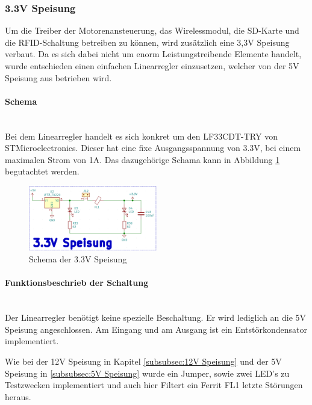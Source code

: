 \subsubsection{3.3V Speisung}
\label{subsubsec:3.3V Speisung}

Um die Treiber der Motorenansteuerung, das Wirelessmodul, die SD-Karte und die RFID-Schaltung betreiben zu können, wird zusätzlich eine 3,3V Speisung verbaut. Da es sich dabei nicht um enorm Leistungstreibende Elemente handelt, wurde entschieden einen einfachen Linearregler einzusetzen, welcher von der 5V Speisung aus betrieben wird. 

\paragraph{Schema}\mbox{}\\

Bei dem Linearregler handelt es sich konkret um den LF33CDT-TRY von STMicroelectronics. Dieser hat eine fixe Ausgangsspannung von 3.3V, bei einem maximalen Strom von 1A. Das dazugehörige Schama kann in Abbildung \ref{fig:Schema_Speisung_3.3V} begutachtet werden. \cite{stmicroelectronics_lf33cdt-try_2017}

\begin{figure}[h!]
	\centering
	\includegraphics[width=0.5\textwidth]{graphics/Schema_Speisung_3,3V.png}
	\caption{Schema der 3.3V Speisung}
	\label{fig:Schema_Speisung_3.3V}
\end{figure} 


\paragraph{Funktionsbeschrieb der Schaltung}\mbox{}\\

Der Linearregler benötigt keine spezielle Beschaltung. Er wird lediglich an die 5V Speisung angeschlossen. Am Eingang und am Ausgang ist ein Entstörkondensator implementiert. 

Wie bei der 12V Speisung in Kapitel \ref{subsubsec:12V Speisung} und der 5V Speisung in \ref{subsubsec:5V Speisung} wurde ein Jumper, sowie zwei LED's zu Testzwecken implementiert und auch hier Filtert ein Ferrit FL1 letzte Störungen heraus.